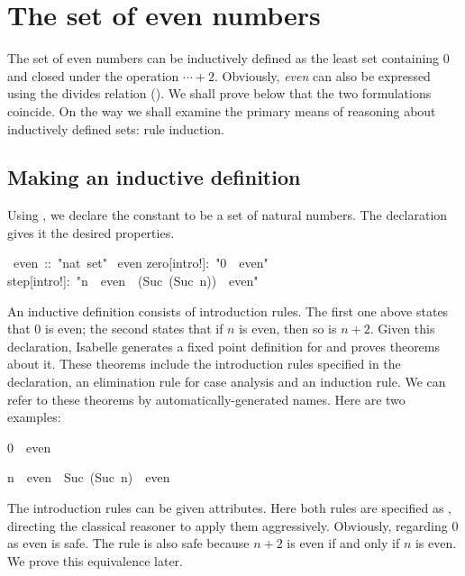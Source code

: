 \section{The set of even numbers}

The set of even numbers can be inductively defined as the least set
containing 0 and closed under the operation ${\cdots}+2$.  Obviously,
\emph{even} can also be expressed using the divides relation (). 
We shall prove below that the two formulations coincide.  On the way we
shall examine the primary means of reasoning about inductively defined
sets: rule induction.

\subsection{Making an inductive definition}

Using , we declare the constant  to be a set
of natural numbers. The  declaration gives it the
desired properties.
\begin{isabelle}
\ even\ ::\ "nat\ set"\isanewline
{}\ even\isanewline
{}\isanewline
zero[intro!]:\ "0\ \isasymin \ even"\isanewline
step[intro!]:\ "n\ \isasymin \ even\ \isasymLongrightarrow \ (Suc\ (Suc\
n))\ \isasymin \ even"
\end{isabelle}

An inductive definition consists of introduction rules.  The first one
above states that 0 is even; the second states that if $n$ is even, then so
is
$n+2$.  Given this declaration, Isabelle generates a fixed point definition
for \isa{even} and proves theorems about it.  These theorems include the
introduction rules specified in the declaration, an elimination rule for case
analysis and an induction rule.  We can refer to these theorems by
automatically-generated names.  Here are two examples:
%
\begin{isabelle}
0\ \isasymin \ even
\par\smallskip
n\ \isasymin \ even\ \isasymLongrightarrow \ Suc\ (Suc\ n)\ \isasymin \
even%
\rulename{even.step}
\end{isabelle}

The introduction rules can be given attributes.  Here both rules are
specified as , directing the classical reasoner to 
apply them aggressively. Obviously, regarding 0 as even is safe.  The
\isa{step} rule is also safe because $n+2$ is even if and only if $n$ is
even.  We prove this equivalence later.

